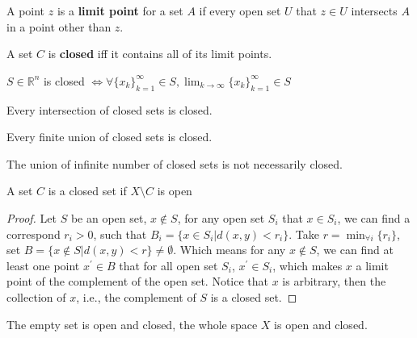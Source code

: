 			\begin{definition}
				A point $z$ is a \textbf{limit point} for a set $A$ if every open set $U$ that $z\in U$ intersects $A$ in a point other than $z$.
			\end{definition}


			\begin{definition}
				A set $C$ is \textbf{closed} iff it contains all of its limit points.
			\end{definition}

			\begin{theorem}
				$S\in \mathbb{R}^n$ is closed $\iff \forall \{x_k\}_{k=1}^\infty \in S, \lim_{k \rightarrow \infty} \{x_k\}_{k=1}^\infty \in S$
			\end{theorem}

			\begin{theorem}
				Every intersection of closed sets is closed.
			\end{theorem}

			\begin{theorem}
				Every finite union of closed sets is closed.
			\end{theorem}

			\begin{remark}
				The union of infinite number of closed sets is not necessarily closed.
			\end{remark}

			\begin{theorem}
				A set $C$ is a closed set if $X \setminus C$ is open
			\end{theorem}

			\begin{proof}
				Let $S$ be an open set, $x \notin S$, for any open set $S_i$ that $x\in S_i$, we can find a correspond $r_i > 0$, such that $B_i = \{x \in S_i | d(x, y) < r_i\}$. Take $r = \min_{\forall i}\{r_i\}$, set $B = \{x \notin S|d(x, y) < r\} \neq \emptyset$. Which means for any $x\notin S$, we can find at least one point $x^\prime \in B$ that for all open set $S_i$, $x^\prime \in S_i$, which makes $x$ a limit point of the complement of the open set. Notice that $x$ is arbitrary, then the collection of $x$, i.e., the complement of $S$ is a closed set.
			\end{proof}

			\begin{remark}
				The empty set is open and closed, the whole space $X$ is open and closed.
			\end{remark}

